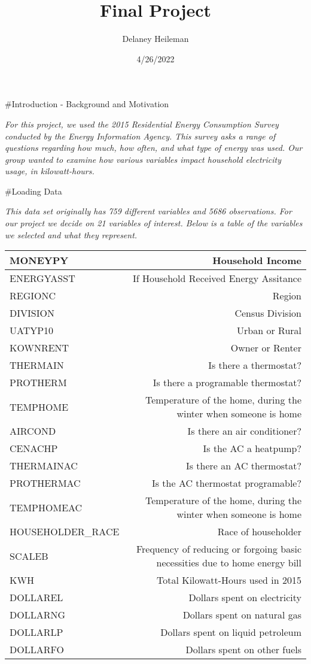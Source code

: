 \documentclass[
]{article}
\title{Final Project}
\author{Delaney Heileman}
\date{4/26/2022}
\begin{document}
\maketitle

\#Introduction - Background and Motivation

\emph{For this project, we used the 2015 Residential Energy Consumption
Survey conducted by the Energy Information Agency. This survey asks a
range of questions regarding how much, how often, and what type of
energy was used. Our group wanted to examine how various variables
impact household electricity usage, in kilowatt-hours.}

\#Loading Data

\emph{This data set originally has 759 different variables and 5686
observations. For our project we decide on 21 variables of interest.
Below is a table of the variables we selected and what they represent.}

\begin{tabular}{l|r}
MONEYPY & Household Income\\
\hline
ENERGYASST & If Household Received Energy Assitance\\
\hline
REGIONC & Region\\
\hline
DIVISION & Census Division\\
\hline
UATYP10 & Urban or Rural\\
\hline
KOWNRENT & Owner or Renter\\
\hline
THERMAIN & Is there a thermostat?\\
\hline
PROTHERM & Is there a programable thermostat?\\
\hline
TEMPHOME & Temperature of the home, during the winter when someone is home\\
\hline
AIRCOND & Is there an air conditioner?\\
\hline
CENACHP & Is the AC a heatpump?\\
\hline
THERMAINAC & Is there an AC thermostat?\\
\hline
PROTHERMAC & Is the AC thermostat programable?\\
\hline
TEMPHOMEAC & Temperature of the home, during the winter when someone is home\\
\hline
HOUSEHOLDER_RACE & Race of householder\\
\hline
SCALEB & Frequency of reducing or forgoing basic necessities due to home energy bill\\
\hline
KWH & Total Kilowatt-Hours used in 2015\\
\hline
DOLLAREL & Dollars spent on electricity\\
\hline
DOLLARNG & Dollars spent on natural gas\\
\hline
DOLLARLP & Dollars spent on liquid petroleum\\
\hline
DOLLARFO & Dollars spent on other fuels\\
\hline
\end{tabular}
\end{document}
